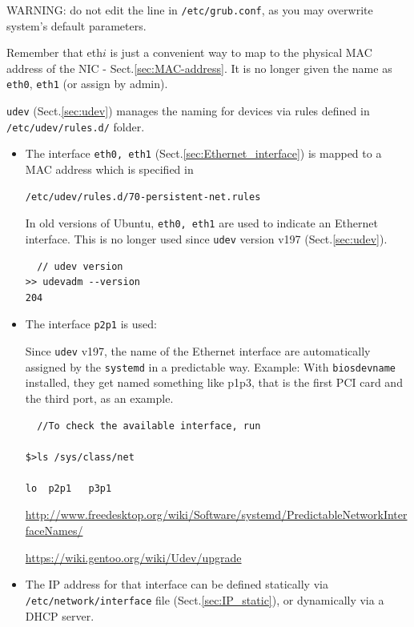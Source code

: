 \begin{itemize}
\begin{enumerate}
WARNING: do not edit the line in \verb!/etc/grub.conf!, as you may overwrite
system's default parameters.

\end{enumerate}  
  
  
Remember that eth$i$ is just a convenient way to map to the physical MAC address
of the NIC - Sect.\ref{sec:MAC-address}. It is no longer given the name as
\verb!eth0!, \verb!eth1! (or assign by admin).
  
\end{itemize}

\verb!udev! (Sect.\ref{sec:udev}) manages the naming for devices via rules
defined in \verb!/etc/udev/rules.d/! folder.

\begin{itemize}
  \item The interface \verb!eth0, eth1! (Sect.\ref{sec:Ethernet_interface}) is mapped to a MAC
  address which is specified in
\begin{verbatim}
/etc/udev/rules.d/70-persistent-net.rules
\end{verbatim}

In old versions of Ubuntu, \verb!eth0, eth1! are used to indicate an Ethernet
interface.  This is no longer used since \verb!udev! version  v197
(Sect.\ref{sec:udev}).  
\begin{verbatim}
  // udev version
>> udevadm --version
204
\end{verbatim}

   \item The interface \verb!p2p1! is used:
   
Since \verb!udev! v197, the name of the Ethernet interface are automatically
assigned by the \verb!systemd! in a predictable way. Example:
With \verb!biosdevname! installed, they get named something like p1p3, that is
the first PCI card and the third port, as an example.
\begin{verbatim}
  //To check the available interface, run

$>ls /sys/class/net
 
lo  p2p1   p3p1
\end{verbatim}
\url{http://www.freedesktop.org/wiki/Software/systemd/PredictableNetworkInterfaceNames/} 

\url{https://wiki.gentoo.org/wiki/Udev/upgrade}

   \item The IP address for that interface can be defined statically via 
   \verb!/etc/network/interface! file (Sect.\ref{sec:IP_static}), or dynamically
   via a DHCP server.
\end{itemize}

